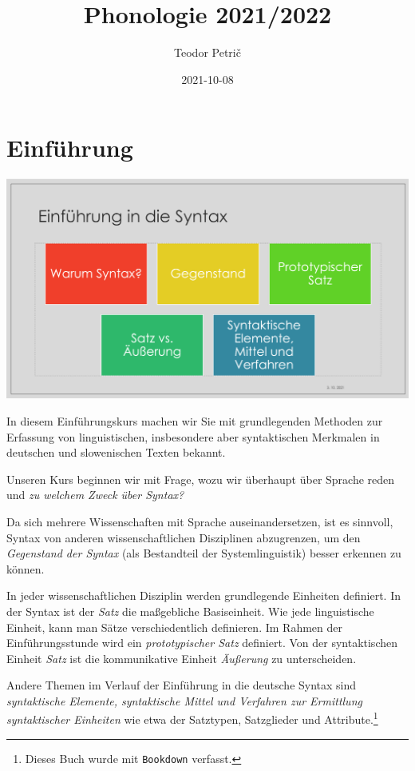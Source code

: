 \documentclass[
]{article}
\title{Phonologie 2021/2022}
\author{Teodor Petrič}
\date{2021-10-08}
\begin{document}
\maketitle

{
\hypersetup{linkcolor=}
\setcounter{tocdepth}{2}
\tableofcontents
}
\hypertarget{einfuxfchrung}{%
\section{Einführung}\label{einfuxfchrung}}

\includegraphics[width=1\linewidth]{pictures/Syntax_intro_01}

In diesem Einführungskurs machen wir Sie mit grundlegenden Methoden zur
Erfassung von linguistischen, insbesondere aber syntaktischen Merkmalen
in deutschen und slowenischen Texten bekannt.

Unseren Kurs beginnen wir mit Frage, wozu wir überhaupt über Sprache
reden und \emph{zu welchem Zweck über Syntax?}

Da sich mehrere Wissenschaften mit Sprache auseinandersetzen, ist es
sinnvoll, Syntax von anderen wissenschaftlichen Disziplinen abzugrenzen,
um den \emph{Gegenstand der Syntax} (als Bestandteil der Systemlinguistik)
besser erkennen zu können.

In jeder wissenschaftlichen Disziplin werden grundlegende Einheiten
definiert. In der Syntax ist der \emph{Satz} die maßgebliche Basiseinheit.
Wie jede linguistische Einheit, kann man Sätze verschiedentlich
definieren. Im Rahmen der Einführungsstunde wird ein \emph{prototypischer
Satz} definiert. Von der syntaktischen Einheit \emph{Satz} ist die
kommunikative Einheit \emph{Äußerung} zu unterscheiden.

Andere Themen im Verlauf der Einführung in die deutsche Syntax sind
\emph{syntaktische Elemente, syntaktische Mittel und Verfahren zur Ermittlung
syntaktischer Einheiten} wie etwa der Satztypen, Satzglieder und
Attribute.\footnote{Dieses Buch wurde mit \texttt{Bookdown} \citep{xie2015} verfasst.}
\end{document}
